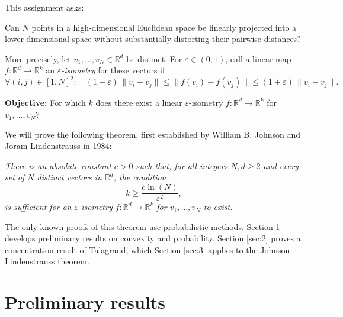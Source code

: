 \documentclass[a4paper]{report}
\begin{document}
This assignment asks:
\begin{tcolorbox}[colframe=black, colback=white, boxrule=0.5mm, sharp corners]
Can $N$ points in a high-dimensional Euclidean space be linearly projected into a lower-dimensional space without substantially distorting their pairwise distances?
\end{tcolorbox}

More precisely, let \(v_1,\ldots,v_N\in\mathbb R^d\) be distinct. For \(\varepsilon\in(0,1)\), call a linear map \(f:\mathbb R^d\to\mathbb R^k\) an \emph{\(\varepsilon\)-isometry} for these vectors if
\[
\forall (i,j)\in[ 1,N] ^2:\quad
(1-\varepsilon)\,\|v_i-v_j\|\le \|f(v_i)-f(v_j)\|\le (1+\varepsilon)\,\|v_i-v_j\|.
\]

\medskip

\textbf{Objective:} For which \(k\) does there exist a linear \(\varepsilon\)-isometry \(f:\mathbb R^d\to\mathbb R^k\) for \(v_1,\ldots,v_N\)?

\medskip

We will prove the following theorem, first established by William B. Johnson and Joram Lindenstrauss in 1984:
\begin{tcolorbox}[colframe=black, colback=white, boxrule=0.5mm, sharp corners]
\emph{There is an absolute constant \(c>0\) such that, for all integers \(N,d\geq2\) and every set of \(N\) distinct vectors in \(\mathbb R^d\), the condition}
\[
k\ge \frac{c\ln(N)}{\varepsilon^2},
\]
\emph{is sufficient for an \(\varepsilon\)-isometry \(f:\mathbb R^d\to\mathbb R^k\) for \(v_1,\ldots,v_N\) to exist.}
\end{tcolorbox}

The only known proofs of this theorem use probabilistic methods. Section \ref{sec:1} develops preliminary results on convexity and probability. Section \ref{sec:2} proves a concentration result of Talagrand, which Section \ref{sec:3} applies to the Johnson--Lindenstrauss theorem.
\pagebreak

\section{Preliminary results}\label{sec:1}
\end{document}
